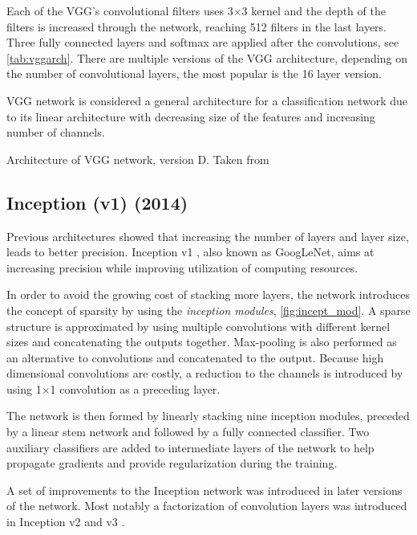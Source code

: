 Each of the VGG's convolutional filters uses 3$\times$3 kernel and the depth of the filters is increased through the network, reaching 512 filters in the last layers. Three fully connected layers and softmax are applied after the convolutions, see \cref{tab:vggarch}. There are multiple versions of the VGG architecture, depending on the number of convolutional layers, the most popular is the 16 layer version. 

VGG network is considered a general architecture for a classification network due to its linear architecture with decreasing size of the features and increasing number of channels. 

\begin{table}[]
    \centering
    \caption{Architecture of VGG network, version D. Taken from \cite[table 1]{bib:vgg}}
    \label{tab:vggarch}
\end{table}
    
\subsection*{Inception (v1) (2014)}
\label{sec:inception}
Previous architectures showed that increasing the number of layers and layer size, leads to better precision. Inception v1 \cite{bib:googlenet}, also known as GoogLeNet, aims at increasing precision while improving utilization of computing resources.

In order to avoid the growing cost of stacking more layers, the network introduces the concept of sparsity by using the \textit{inception modules}, \cref{fig:incept_mod}. A sparse structure is approximated by using multiple convolutions with different kernel sizes and concatenating the outputs together. Max-pooling is also performed as an alternative to convolutions and concatenated to the output. Because high dimensional convolutions are costly, a reduction to the channels is introduced by using 1$\times$1 convolution as a preceding layer.

The network is then formed by linearly stacking nine inception modules, preceded by a linear stem network and followed by a fully connected classifier. Two auxiliary classifiers are added to intermediate layers of the network to help propagate gradients and provide regularization during the training.

A set of improvements to the Inception network was introduced in later versions of the network. Most notably a factorization of convolution layers was introduced in Inception v2 and v3 \cite{bib:inception2}.



